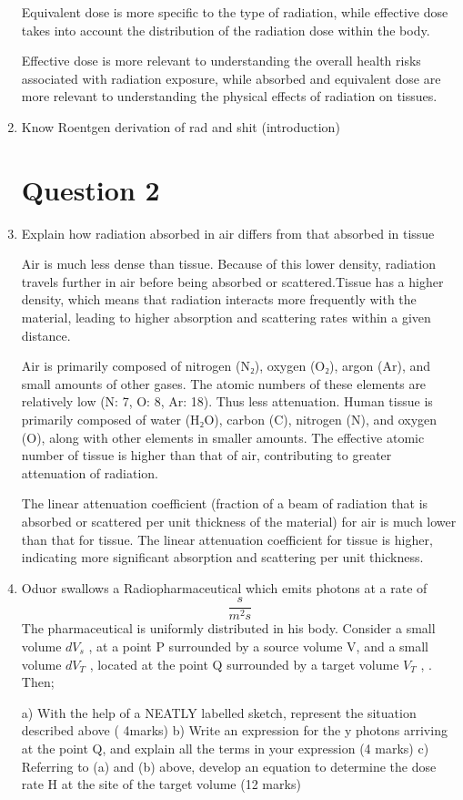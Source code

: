 \documentclass[a4paper,12pt]{article}
\begin{document}
\begin{enumerate}
Equivalent dose is more specific to the type of radiation, while effective dose takes into account the distribution of the radiation dose within the body.

Effective dose is more relevant to understanding the overall health risks associated with radiation exposure, while absorbed and equivalent dose are more relevant to understanding the physical effects of radiation on tissues.
\item Know Roentgen derivation of rad and shit (introduction)
\newpage
\section*{Question 2}
\item Explain how radiation absorbed in air differs from that absorbed in tissue

Air is much less dense than tissue. Because of this lower density, radiation travels further in air before being absorbed or scattered.Tissue has a higher density, which means that radiation interacts more frequently with the material, leading to higher absorption and scattering rates within a given distance.

Air is primarily composed of nitrogen (N₂), oxygen (O₂), argon (Ar), and small amounts of other gases. The atomic numbers of these elements are relatively low (N: 7, O: 8, Ar: 18). Thus less attenuation.
Human tissue is primarily composed of water (H₂O), carbon (C), nitrogen (N), and oxygen (O), along with other elements in smaller amounts. The effective atomic number of tissue is higher than that of air, contributing to greater attenuation of radiation.

The linear attenuation coefficient (fraction of a beam of radiation that is absorbed or scattered per unit thickness of the material) for air is much lower than that for tissue. The linear attenuation coefficient for tissue is higher, indicating more significant absorption and scattering per unit thickness.
\item Oduor swallows a Radiopharmaceutical which emits photons at a rate of  \begin{equation}
    \frac{s}{m^2 s}
\end{equation}The pharmaceutical is uniformly distributed in his body. Consider a small volume \(dV_s\) , at a point
P surrounded by a source volume V, and a small volume \(dV_T\) , located at the point Q surrounded by a target volume \(V_T\) , . Then;

\subitem a) With the help of a NEATLY labelled sketch, represent the situation described above ( 4marks)
\subitem b) Write an expression for the y photons arriving at the point Q, and explain all the terms in your expression (4 marks)
\subitem c) Referring to (a) and (b) above, develop an equation to determine the dose rate H at the site of the target volume (12 marks)

\end{enumerate}
\end{document}
